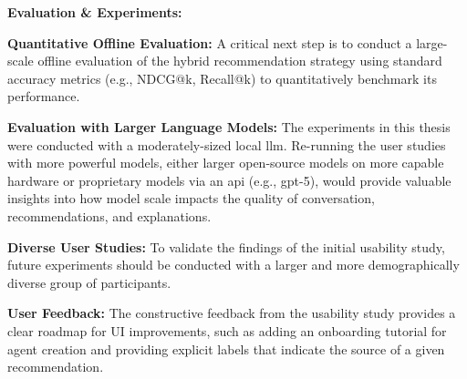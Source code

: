 \begin{compactitem}[\textbullet]
    \item \textbf{Evaluation \& Experiments:}
    \begin{compactenum}
        \item \textbf{Quantitative Offline Evaluation:} A critical next step is to conduct a large-scale offline evaluation of the hybrid recommendation strategy using standard accuracy metrics (e.g., NDCG@k, Recall@k) to quantitatively benchmark its performance.
        \item \textbf{Evaluation with Larger Language Models:} The experiments in this thesis were conducted with a moderately-sized local \ac{llm}. Re-running the user studies with more powerful models, either larger open-source models on more capable hardware or proprietary models via an \ac{api} (e.g., \acs{gpt}-5), would provide valuable insights into how model scale impacts the quality of conversation, recommendations, and explanations.
        \item \textbf{Diverse User Studies:} To validate the findings of the initial usability study, future experiments should be conducted with a larger and more demographically diverse group of participants.
    \end{compactenum}

    \item \textbf{User Feedback:} The constructive feedback from the usability study provides a clear roadmap for UI improvements, such as adding an onboarding tutorial for agent creation and providing explicit labels that indicate the source of a given recommendation.
\end{compactitem}
